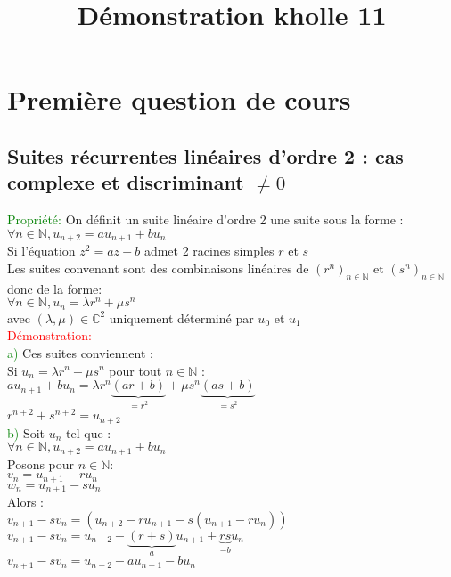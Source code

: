 \documentclass{article}
\begin{document}
\title{Démonstration kholle 11}
\date{}
\maketitle
	\renewcommand{\thesection}{\Roman{section}}
	\setlength{\parindent}{1.5cm}
\section{Première question de cours}
\subsection{Suites récurrentes linéaires d'ordre 2 : cas complexe et discriminant $\neq 0$}
\textcolor{green}{Propriété:}
On définit un suite linéaire d'ordre 2 une suite sous la forme : \\ 
$\forall n \in \mathbb{N},u_{n+2}=au_{n+1}+bu_n$ \\ 
Si l'équation $z^2=az+b$ admet 2 racines simples $r$ et $s$ \\ 
Les suites convenant sont des combinaisons linéaires de $(r^n)_{n \in \mathbb{N}}$ et $(s^n)_{n \in \mathbb{N}}$ donc de la forme: \\ 
$\forall n \in \mathbb{N},u_n= \lambda r^n+\mu s^n$ \\ 
avec $(\lambda,\mu) \in \mathbb{C}^2$ uniquement déterminé par $u_0$ et $u_1$ \\ 
\textcolor{red}{Démonstration:} \\ 
\textcolor{green}{a)} Ces suites conviennent : \\ 
Si $u_n= \lambda r^n+\mu s^n$ pour tout $n \in \mathbb{N}$ : \\ 
$a u_{n+1}+bu_n= \lambda r^n\underbrace{(ar+b)}_{=r^2} + \mu s^n\underbrace{(as+b)}_{=s^2}$ \\ 
$r^{n+2}+s^{n+2}=u_{n+2}$ \\ 
\textcolor{green}{b)} Soit $u_n$ tel que : \\ 
$\forall n \in \mathbb{N},u_{n+2}=au_{n+1}+bu_n$ \\ 
Posons pour $n \in \mathbb{N}$: \\ 
$v_n=u_{n+1}-ru_n$ \\ 
$w_n=u_{n+1}-su_n$ \\ 
Alors :  \\ 
$v_{n+1}-sv_n=(u_{n+2}-ru_{n+1}-s(u_{n+1}-ru_n))$ \\ 
$v_{n+1}-sv_n=u_{n+2}-\underbrace{(r+s)}_{a}u_{n+1}+\underbrace{rs}_{-b}u_n$ \\ 
$v_{n+1}-sv_n= u_{n+2}-au_{n+1}-bu_n$ \\ 
\end{document}
